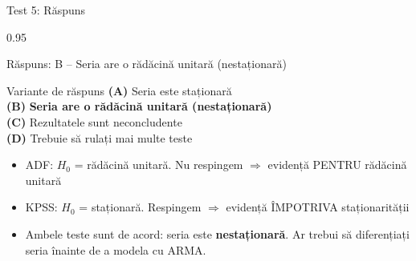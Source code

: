 \documentclass[9pt, aspectratio=169, t]{beamer}
\begin{document}
\begin{frame}{Test 5: Răspuns}
    \begin{cminipage}{0.95\textwidth}
    \begin{exampleblock}{Răspuns: B -- Seria are o rădăcină unitară (nestaționară)}
    {\small
        \begin{block}{Variante de răspuns}
            \textcolor{MainBlue}{\textbf{(A)}} Seria este staționară \incorrect\\[3pt]
            \textcolor{MainBlue}{\textbf{(B)}} \textbf{\textcolor{Forest}{Seria are o rădăcină unitară (nestaționară)}} \correct\\[3pt]
            \textcolor{MainBlue}{\textbf{(C)}} Rezultatele sunt neconcludente \incorrect\\[3pt]
            \textcolor{MainBlue}{\textbf{(D)}} Trebuie să rulați mai multe teste \incorrect
        \end{block}

        \vspace{0.1cm}

        \begin{itemize}\setlength{\itemsep}{0pt}
            \item ADF: $H_0$ = rădăcină unitară. Nu respingem $\Rightarrow$ evidență PENTRU rădăcină unitară
            \item KPSS: $H_0$ = staționară. Respingem $\Rightarrow$ evidență ÎMPOTRIVA staționarității
            \item Ambele teste sunt de acord: seria este \textbf{nestaționară}. Ar trebui să diferențiați seria înainte de a modela cu ARMA.
        \end{itemize}
    }
    \end{exampleblock}
    \end{cminipage}
\end{frame}
\end{document}
